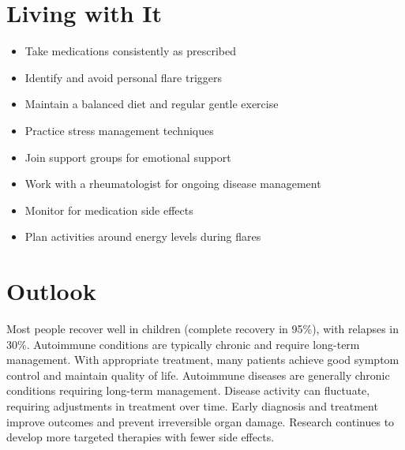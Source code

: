 \section{Living with It}
\begin{itemize}[noitemsep]
  \item Take medications consistently as prescribed
  \item Identify and avoid personal flare triggers
  \item Maintain a balanced diet and regular gentle exercise
  \item Practice stress management techniques
  \item Join support groups for emotional support
  \item Work with a rheumatologist for ongoing disease management
  \item Monitor for medication side effects
  \item Plan activities around energy levels during flares
\end{itemize}
\section{Outlook}
Most people recover well in children (complete recovery in 95\%), with relapses in 30\%. Autoimmune conditions are typically chronic and require long-term management. With appropriate treatment, many patients achieve good symptom control and maintain quality of life. Autoimmune diseases are generally chronic conditions requiring long-term management. Disease activity can fluctuate, requiring adjustments in treatment over time. Early diagnosis and treatment improve outcomes and prevent irreversible organ damage. Research continues to develop more targeted therapies with fewer side effects.
